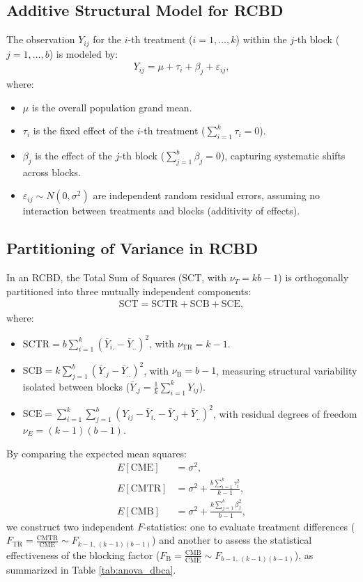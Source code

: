 \subsection{Additive Structural Model for RCBD}
The observation $Y_{ij}$ for the $i$-th treatment ($i=1,\dots,k$) within the $j$-th block ($j=1,\dots,b$) is modeled by:
\begin{align}
	Y_{ij} = \mu + \tau_i + \beta_j + \varepsilon_{ij},
\end{align}
where:
\begin{itemize}
	\item $\mu$ is the overall population grand mean.
	\item $\tau_i$ is the fixed effect of the $i$-th treatment ($\sum_{i=1}^k \tau_i = 0$).
	\item $\beta_j$ is the effect of the $j$-th block ($\sum_{j=1}^b \beta_j = 0$), capturing systematic shifts across blocks.
	\item $\varepsilon_{ij} \sim N(0, \sigma^2)$ are independent random residual errors, assuming no interaction between treatments and blocks (additivity of effects).
\end{itemize}

\subsection{Partitioning of Variance in RCBD}
In an RCBD, the Total Sum of Squares ($\text{SCT}$, with $\nu_T = kb - 1$) is orthogonally partitioned into three mutually independent components:
\begin{align}
	\text{SCT} = \text{SCTR} + \text{SCB} + \text{SCE},
\end{align}
where:
\begin{itemize}
	\item $\text{SCTR} = b \sum_{i=1}^k (\bar{Y}_{i.} - \bar{Y}_{..})^2$, with $\nu_{\text{TR}} = k - 1$.
	\item $\text{SCB} = k \sum_{j=1}^b (\bar{Y}_{.j} - \bar{Y}_{..})^2$, with $\nu_{\text{B}} = b - 1$, measuring structural variability isolated between blocks ($\bar{Y}_{.j} = \frac{1}{k} \sum_{i=1}^k Y_{ij}$).
	\item $\text{SCE} = \sum_{i=1}^k \sum_{j=1}^b (Y_{ij} - \bar{Y}_{i.} - \bar{Y}_{.j} + \bar{Y}_{..})^2$, with residual degrees of freedom $\nu_E = (k - 1)(b - 1)$.
\end{itemize}

By comparing the expected mean squares:
\begin{align}
	E[\text{CME}] &= \sigma^2, \\
	E[\text{CMTR}] &= \sigma^2 + \frac{b \sum_{i=1}^k \tau_i^2}{k - 1}, \\
	E[\text{CMB}] &= \sigma^2 + \frac{k \sum_{j=1}^b \beta_j^2}{b - 1},
\end{align}
we construct two independent $F$-statistics: one to evaluate treatment differences ($F_{\text{TR}} = \frac{\text{CMTR}}{\text{CME}} \sim F_{k-1, \, (k-1)(b-1)}$) and another to assess the statistical effectiveness of the blocking factor ($F_{\text{B}} = \frac{\text{CMB}}{\text{CME}} \sim F_{b-1, \, (k-1)(b-1)}$), as summarized in Table \ref{tab:anova_dbca}.

